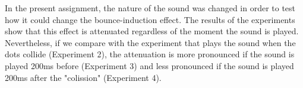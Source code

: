 In the present assignment, the nature of the sound was changed in order to test how it could change the bounce-induction effect. The results of the experiments show that this effect is attenuated regardless of the moment the sound is played. Nevertheless, if we compare with the experiment that plays the sound when the dots collide (Experiment 2), the attenuation is more pronounced if the sound is played 200ms before (Experiment 3) and less pronounced if the sound is played 200ms after the "colission" (Experiment 4). 

